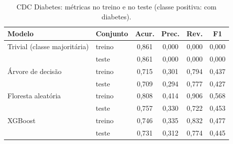 \begin{table}[!t]
\centering
\caption{CDC Diabetes: métricas no treino e no teste (classe positiva: com diabetes).}
\label{tab:cdc_metricas}
\begin{tabular}{llcccc}
\hline
Modelo & Conjunto & Acur. & Prec. & Rev. & F1 \\
\hline
Trivial (classe majoritária) & treino & 0,861 & 0,000 & 0,000 & 0,000 \\
 & teste & 0,861 & 0,000 & 0,000 & 0,000 \\
Árvore de decisão & treino & 0,715 & 0,301 & 0,794 & 0,437 \\
 & teste & 0,709 & 0,294 & 0,777 & 0,427 \\
Floresta aleatória & treino & 0,808 & 0,414 & 0,906 & 0,568 \\
 & teste & 0,757 & 0,330 & 0,722 & 0,453 \\
XGBoost & treino & 0,746 & 0,335 & 0,832 & 0,477 \\
 & teste & 0,731 & 0,312 & 0,774 & 0,445 \\
\hline
\end{tabular}
\end{table}